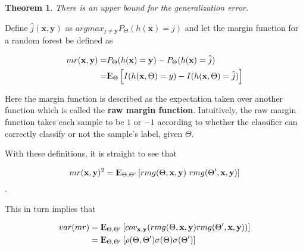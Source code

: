 \documentclass{article}%
\newcommand{\Expect}{{\rm I\kern-.3em E}}
\newtheorem{theorem}{Theorem}[section]
\newtheorem{lemma}[theorem]{Lemma}
\theoremstyle{definition}
\begin{document}

\begin{theorem}
There is an upper bound for the generalization error.
\end{theorem}
Define $\hat{j}(\textbf{x},\textbf{y})$ as $arg max_{j\neq \textbf{y}} P_{\Theta}(h(\textbf{x}) = j)$ and let the margin function for a random forest be defined as

\begin{equation}\label{eq:rf-marginFunRf}
\begin{split}
mr(\textbf{x},\textbf{y}) = & P_{\Theta}(h(\textbf{x}) = \textbf{y}) - P_{\Theta}(h(\textbf{x}) = \hat{j}) 
\\ 
= & \Expect_{\Theta} \left[  I(h(\textbf{x},\Theta ) = y ) - I( h( \textbf{x},\Theta ) = \hat{j} )  \right]
\end{split}
\end{equation} 




Here the margin function is described as the expectation taken over another function which is called the \textbf{raw margin function}\label{eq:rf-rawMarginFun}. Intuitively, the raw margin function takes each sample to be $1$ or $-1$ according to whether the classifier can correctly classify or not the sample's label, given $\Theta$.

With these definitions, it is straight to see that 

$$mr( \textbf{x},\textbf{y} )^2 = \Expect_{\Theta, \Theta'} \left[ rmg( \Theta,\textbf{x},\textbf{y} ) \ rmg(\Theta',\textbf{x},\textbf{y} )  \right] $$.

This in turn implies that

\begin{equation}\label{eq:rf-marginFunVar}
\begin{split}
var(mr) & =  \Expect_{\Theta, \Theta'} 
			\left[ 
				cov_{\textbf{x},\textbf{y}}
				(rmg(\Theta,\textbf{x},\textbf{y} )rmg(\Theta',\textbf{x},\textbf{y} )) 
			\right] \\
& =  \Expect_{\Theta, \Theta'}
			\left[ 
				\rho(\Theta, \Theta')\sigma(\Theta)\sigma(\Theta')
			\right] 
\end{split}
\end{equation}
\end{document}
